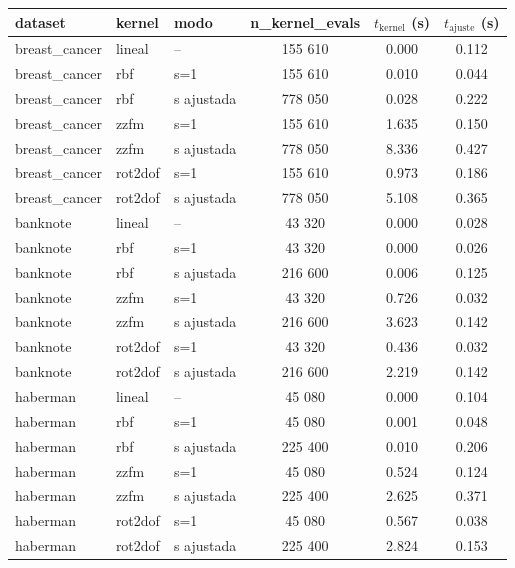 \begin{tabular}{lllccc}
\hline
dataset & kernel & modo & n\_kernel\_evals & $t_{\mathrm{kernel}}$ (s) & $t_{\mathrm{ajuste}}$ (s) \\
\hline
breast\_cancer & lineal & -- & 155 610 & 0.000 & 0.112 \\
breast\_cancer & rbf & s=1 & 155 610 & 0.010 & 0.044 \\
breast\_cancer & rbf & s ajustada & 778 050 & 0.028 & 0.222 \\
breast\_cancer & zzfm & s=1 & 155 610 & 1.635 & 0.150 \\
breast\_cancer & zzfm & s ajustada & 778 050 & 8.336 & 0.427 \\
breast\_cancer & rot2dof & s=1 & 155 610 & 0.973 & 0.186 \\
breast\_cancer & rot2dof & s ajustada & 778 050 & 5.108 & 0.365 \\
banknote & lineal & -- & 43 320 & 0.000 & 0.028 \\
banknote & rbf & s=1 & 43 320 & 0.000 & 0.026 \\
banknote & rbf & s ajustada & 216 600 & 0.006 & 0.125 \\
banknote & zzfm & s=1 & 43 320 & 0.726 & 0.032 \\
banknote & zzfm & s ajustada & 216 600 & 3.623 & 0.142 \\
banknote & rot2dof & s=1 & 43 320 & 0.436 & 0.032 \\
banknote & rot2dof & s ajustada & 216 600 & 2.219 & 0.142 \\
haberman & lineal & -- & 45 080 & 0.000 & 0.104 \\
haberman & rbf & s=1 & 45 080 & 0.001 & 0.048 \\
haberman & rbf & s ajustada & 225 400 & 0.010 & 0.206 \\
haberman & zzfm & s=1 & 45 080 & 0.524 & 0.124 \\
haberman & zzfm & s ajustada & 225 400 & 2.625 & 0.371 \\
haberman & rot2dof & s=1 & 45 080 & 0.567 & 0.038 \\
haberman & rot2dof & s ajustada & 225 400 & 2.824 & 0.153 \\
\hline
\end{tabular}
